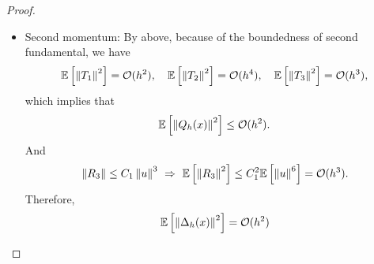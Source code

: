 \begin{proof}
\begin{itemize}
        \item Second momentum: By above, because of the boundedness of second fundamental, we have
        \begin{equation*}
            \mathbb{E}\left[\left\lVert T_1\right\lVert^2\right] =\mathcal{O}(h^2),\quad  \mathbb{E}\left[\left\lVert T_2\right\lVert^2\right] =\mathcal{O}(h^4),\quad  \mathbb{E}\left[\left\lVert T_3\right\lVert^2\right] =\mathcal{O}(h^3),
        \end{equation*}
        which implies that
        \begin{equation*}
            \mathbb{E}\left[\left\lVert Q_h(x)\right\lVert^2\right] \leq \mathcal{O}(h^2).
        \end{equation*}
        And
        \begin{equation*}
            \left\lVert R_3\right\lVert \leq C_1\left\lVert u\right\lVert^3~\Rightarrow~ \mathbb{E}\left[\left\lVert R_3\right\lVert^2\right] \leq C^2_1\mathbb{E}\left[\left\lVert u\right\lVert^6\right] = \mathcal{O}(h^3).
        \end{equation*}
        Therefore,
        \begin{equation*}
            \mathbb{E}\left[\left\lVert\Delta_h(x)\right\lVert^2\right] = \mathcal{O}(h^2)
        \end{equation*}
    \end{itemize}   


\end{proof}
